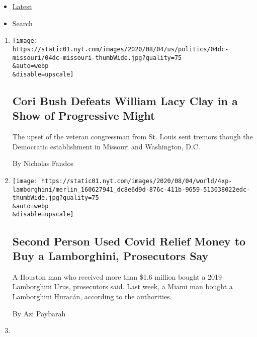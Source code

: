 \begin{itemize}
\tightlist
\item
  \protect\hyperlink{stream-panel}{Latest}
\item
  Search
\end{itemize}

\begin{enumerate}
\def\labelenumi{\arabic{enumi}.}
\item
  \href{/2020/08/05/us/politics/cori-bush-missouri-william-lacy-clay.html}{}

  \texttt{[image: https://static01.nyt.com/images/2020/08/04/us/politics/04dc-missouri/04dc-missouri-thumbWide.jpg?quality=75\\\&auto=webp\\\&disable=upscale]}

  \hypertarget{cori-bush-defeats-william-lacy-clay-in-a-show-of-progressive-might}{%
  \subsection{Cori Bush Defeats William Lacy Clay in a Show of
  Progressive
  Might}\label{cori-bush-defeats-william-lacy-clay-in-a-show-of-progressive-might}}

  The upset of the veteran congressman from St. Louis sent tremors
  though the Democratic establishment in Missouri and Washington, D.C.

  By Nicholas Fandos
\item
  \href{/2020/08/04/us/lamborghini-coronavirus-stimulus.html}{}

  \texttt{[image: https://static01.nyt.com/images/2020/08/04/world/4xp-lamborghini/merlin\_160627941\_dc8e6d9d-876c-411b-9659-513038022edc-thumbWide.jpg?quality=75\\\&auto=webp\\\&disable=upscale]}

  \hypertarget{second-person-used-covid-relief-money-to-buy-a-lamborghini-prosecutors-say}{%
  \subsection{Second Person Used Covid Relief Money to Buy a
  Lamborghini, Prosecutors
  Say}\label{second-person-used-covid-relief-money-to-buy-a-lamborghini-prosecutors-say}}

  A Houston man who received more than \$1.6 million bought a 2019
  Lamborghini Urus, prosecutors said. Last week, a Miami man bought a
  Lamborghini Huracán, according to the authorities.

  By Azi Paybarah
\item
  \href{/interactive/2020/08/04/us/elections/results-arizona-house-district-4-primary-election.html}{}


\end{enumerate}
